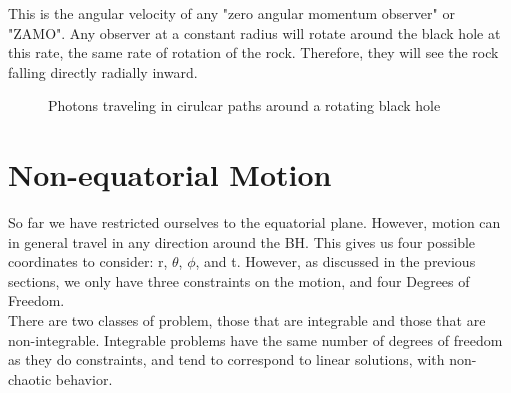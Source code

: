 \documentclass[11pt,table]{article}
\begin{document}
This is the angular velocity of any "zero angular momentum observer" or "ZAMO". Any observer at a constant radius will rotate around the black hole at this rate, the same rate of rotation of the rock. Therefore, they will see the rock falling directly radially inward.

\begin{figure}[!h]
  \centering
  \caption{Photons traveling in cirulcar paths around a rotating black hole}
  \label{fig:ZAMOs}
\end{figure}

\section{Non-equatorial Motion}

So far we have restricted ourselves to the equatorial plane. However, motion can in general travel in any direction around the BH. This gives us four possible coordinates to consider: r, $\theta$, $\phi$, and t. However, as discussed in the previous sections, we only have three constraints on the motion, and four Degrees of Freedom. \\

There are two classes of problem, those that are integrable and those that are non-integrable. Integrable problems have the same number of degrees of freedom as they do constraints, and tend to correspond to linear solutions, with non-chaotic behavior. \\
\end{document}
